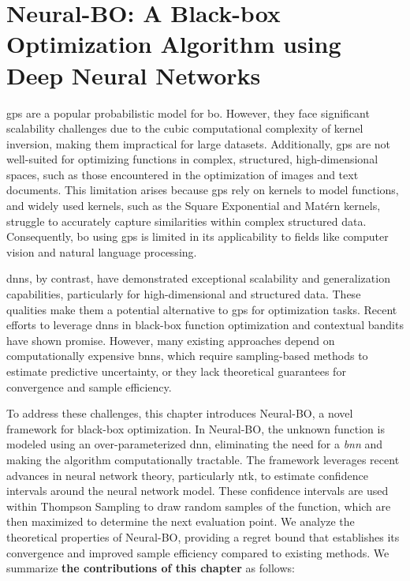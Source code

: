 \chapter[Black-box Optimization Algorithm using Deep Neural Networks]{Neural-BO: A Black-box Optimization Algorithm using Deep Neural Networks} %
\label{chap:neural-bo}

\acfp{gp} are a popular probabilistic model for \ac{bo}. However, they face significant scalability challenges due to the cubic computational complexity of kernel inversion, making them impractical for large datasets. Additionally, \acp{gp} are not well-suited for optimizing functions in complex, structured, high-dimensional spaces, such as those encountered in the optimization of images and text documents. This limitation arises because \acp{gp} rely on kernels to model functions, and widely used kernels, such as the Square Exponential and Mat\'ern kernels, struggle to accurately capture similarities within complex structured data. Consequently, \ac{bo} using \acp{gp} is limited in its applicability to fields like computer vision and natural language processing.

\acfp{dnn}, by contrast, have demonstrated exceptional scalability and generalization capabilities, particularly for high-dimensional and structured data. These qualities make them a potential alternative to \acp{gp} for optimization tasks. Recent efforts to leverage \acp{dnn} in black-box function optimization and contextual bandits have shown promise. However, many existing approaches depend on computationally expensive \acfp{bnn}, which require sampling-based methods to estimate predictive uncertainty, or they lack theoretical guarantees for convergence and sample efficiency.

To address these challenges, this chapter introduces Neural-BO, a novel framework for black-box optimization. In Neural-BO, the unknown function is modeled using an over-parameterized \ac{dnn}, eliminating the need for a \emph{\acf{bnn}} and making the algorithm computationally tractable. The framework leverages recent advances in neural network theory, particularly \acf{ntk}, to estimate confidence intervals around the neural network model. These confidence intervals are used within Thompson Sampling to draw random samples of the function, which are then maximized to determine the next evaluation point. We analyze the theoretical properties of Neural-BO, providing a regret bound that establishes its convergence and improved sample efficiency compared to existing methods. We summarize \textbf{the contributions of this chapter} as follows:

